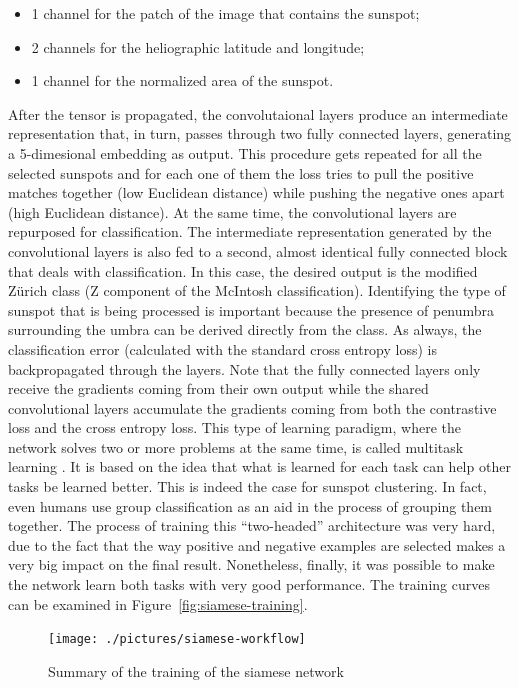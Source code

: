 \begin{itemize}
  \item 1 channel for the patch of the image that contains the sunspot;
  \item 2 channels for the heliographic latitude and longitude;
  \item 1 channel for the normalized area of the sunspot.
\end{itemize}
After the tensor is propagated, the convolutaional layers produce an intermediate representation that, in turn, passes through two fully connected layers, generating a 5-dimesional embedding as output. This procedure gets repeated for all the selected sunspots and for each one of them the loss tries to pull the positive matches together (low Euclidean distance) while pushing the negative ones apart (high Euclidean distance).
\bigbreak
\noindent At the same time, the convolutional layers are repurposed for classification. The intermediate representation generated by the convolutional layers is also fed to a second, almost identical fully connected block that deals with classification. In this case, the desired output is the modified Z\"{u}rich class (Z component of the McIntosh classification). Identifying the type of sunspot that is being processed is important because the presence of penumbra surrounding the umbra can be derived directly from the class. As always, the classification error (calculated with the standard cross entropy loss) is backpropagated through the layers. Note that the fully connected layers only receive the gradients coming from their own output while the shared convolutional layers accumulate the gradients coming from both the contrastive loss and the cross entropy loss.
\bigbreak
\noindent This type of learning paradigm, where the network solves two or more problems at the same time, is called multitask learning \cite{caruana1997multitask}. It is based on the idea that what is learned for each task can help other tasks be learned better. This is indeed the case for sunspot clustering. In fact, even humans use group classification as an aid in the process of grouping them together.
\bigbreak
\noindent The process of training this ``two-headed'' architecture was very hard, due to the fact that the way positive and negative examples are selected makes a very big impact on the final result. Nonetheless, finally, it was possible to make the network learn both tasks with very good performance. The training curves can be examined in Figure~\ref{fig:siamese-training}.
\begin{figure}[hb!]
  \centering
  \captionsetup{justification=centering}
  \texttt{[image: ./pictures/siamese-workflow]}
  \caption{Summary of the training of the siamese network}
  \label{fig:siamese-workflow}
\end{figure}
